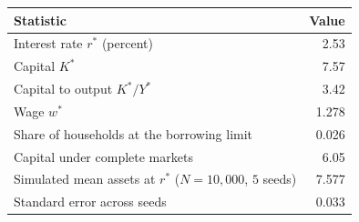 \begin{tabular}{lr}
\toprule
Statistic & Value \\
\midrule
Interest rate $r^*$ (percent) & 2.53 \\
Capital $K^*$ & 7.57 \\
Capital to output $K^* / Y^*$ & 3.42 \\
Wage $w^*$ & 1.278 \\
Share of households at the borrowing limit & 0.026 \\
Capital under complete markets & 6.05 \\
Simulated mean assets at $r^*$ ($N = 10{,}000$, $5$ seeds) & 7.577 \\
Standard error across seeds & 0.033 \\
\bottomrule
\end{tabular}

